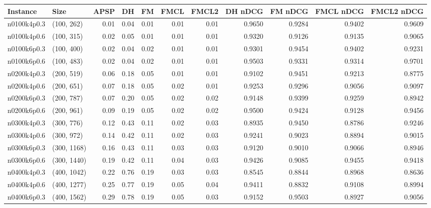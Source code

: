 \begin{tabular}{llrrrrrrrrr}
\toprule
   Instance &          Size &   APSP &     DH &    FM &  FMCL &  FMCL2 &  DH nDCG &  FM nDCG &  FMCL nDCG &  FMCL2 nDCG \\
\midrule
n0100k4p0.3 &    (100, 262) &   0.01 &   0.04 &  0.01 &  0.01 &   0.01 &   0.9650 &   0.9284 &     0.9402 &      0.9609 \\
n0100k4p0.6 &    (100, 315) &   0.02 &   0.05 &  0.01 &  0.01 &   0.01 &   0.9320 &   0.9126 &     0.9135 &      0.9065 \\
n0100k6p0.3 &    (100, 400) &   0.02 &   0.04 &  0.02 &  0.01 &   0.01 &   0.9301 &   0.9454 &     0.9402 &      0.9231 \\
n0100k6p0.6 &    (100, 483) &   0.02 &   0.04 &  0.02 &  0.01 &   0.01 &   0.9503 &   0.9331 &     0.9314 &      0.9701 \\
n0200k4p0.3 &    (200, 519) &   0.06 &   0.18 &  0.05 &  0.01 &   0.01 &   0.9102 &   0.9451 &     0.9213 &      0.8775 \\
n0200k4p0.6 &    (200, 651) &   0.07 &   0.18 &  0.05 &  0.02 &   0.01 &   0.9253 &   0.9296 &     0.9056 &      0.9097 \\
n0200k6p0.3 &    (200, 787) &   0.07 &   0.20 &  0.05 &  0.02 &   0.02 &   0.9148 &   0.9399 &     0.9259 &      0.8942 \\
n0200k6p0.6 &    (200, 961) &   0.09 &   0.19 &  0.05 &  0.02 &   0.02 &   0.9500 &   0.9424 &     0.9128 &      0.9456 \\
n0300k4p0.3 &    (300, 776) &   0.12 &   0.43 &  0.11 &  0.02 &   0.03 &   0.8935 &   0.9450 &     0.8786 &      0.9246 \\
n0300k4p0.6 &    (300, 972) &   0.14 &   0.42 &  0.11 &  0.02 &   0.03 &   0.9241 &   0.9023 &     0.8894 &      0.9015 \\
n0300k6p0.3 &   (300, 1168) &   0.16 &   0.43 &  0.11 &  0.03 &   0.03 &   0.9120 &   0.9010 &     0.9066 &      0.8946 \\
n0300k6p0.6 &   (300, 1440) &   0.19 &   0.42 &  0.11 &  0.04 &   0.03 &   0.9426 &   0.9085 &     0.9455 &      0.9418 \\
n0400k4p0.3 &   (400, 1042) &   0.22 &   0.76 &  0.19 &  0.03 &   0.03 &   0.8545 &   0.8844 &     0.8968 &      0.8636 \\
n0400k4p0.6 &   (400, 1277) &   0.25 &   0.77 &  0.19 &  0.05 &   0.04 &   0.9411 &   0.8832 &     0.9108 &      0.8994 \\
n0400k6p0.3 &   (400, 1562) &   0.29 &   0.78 &  0.19 &  0.05 &   0.03 &   0.9152 &   0.9503 &     0.8927 &      0.9056 \\

\end{tabular}
